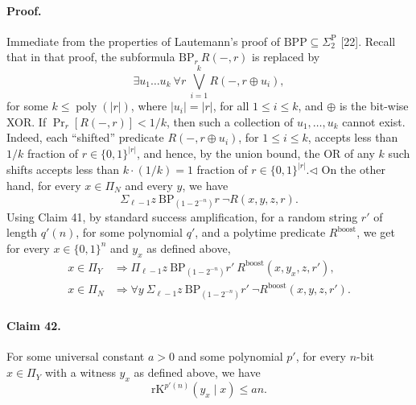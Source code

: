 \documentclass[10pt,a4paper]{article}
\begin{document}
\paragraph{Proof.} Immediate from the properties of Lautemann's proof of $\mathrm{BPP}\subseteq\Sigma_2^{\mathrm P}$ [22]. Recall that in that proof, the subformula $\mathrm{BP}_r\ R(-,r)$ is replaced by
\[\exists u_1\ldots u_k\ \forall r\ \bigvee_{i=1}^kR(-,r\oplus u_i),\]
for some $k\leq\operatorname{poly}(|r|)$, where $|u_i|=|r|$, for all $1\leq i\leq k$, and $\oplus$ is the bit-wise XOR. If $\Pr_r[R(-,r)]<1/k$, then such a collection of $u_1,\ldots,u_k$ cannot exist. Indeed, each ``shifted'' predicate $R(-,r\oplus u_i)$, for $1\leq i\leq k$, accepts less than $1/k$ fraction of $r\in\{0,1\}^{|r|}$, and hence, by the union bound, the OR of any $k$ such shifts accepts less than $k\cdot(1/k)=1$ fraction of $r\in\{0,1\}^{|r|}$.\hfill$\triangleleft$
On the other hand, for every $x\in\Pi_N$ and every $y$, we have
\[\Sigma_{\ell-1}z\ \mathrm{BP}_{(1-2^{-n})}r\ \neg R(x,y,z,r).\]
Using Claim 41, by standard success amplification, for a random string $r'$ of length $q'(n)$, for some polynomial $q'$, and a polytime predicate $R^{\mathrm{boost}}$, we get for every $x\in\{0,1\}^n$ and $y_x$ as defined above,
\begin{align*}
x\in\Pi_Y&\Longrightarrow\Pi_{\ell-1}z\ \mathrm{BP}_{(1-2^{-n})}r'\ R^{\mathrm{boost}}(x,y_x,z,r'),\tag{24}\\
x\in\Pi_N&\Longrightarrow\forall y\ \Sigma_{\ell-1}z\ \mathrm{BP}_{(1-2^{-n})}r'\ \neg R^{\mathrm{boost}}(x,y,z,r').\tag{25}
\end{align*}
\paragraph{Claim 42.} For some universal constant $a>0$ and some polynomial $p'$, for every $n$-bit $x\in\Pi_Y$ with a witness $y_x$ as defined above, we have
\[\mathrm{rK}^{p'(n)}(y_x\mid x)\leq an.\]
\end{document}
